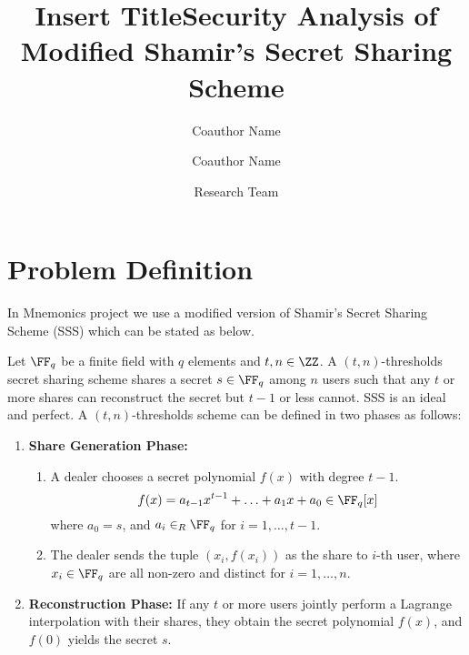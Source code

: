 \documentclass[envcountsame,runningheads,notitlepage]{llncs}
\title{Insert Title}
\date{}
\author{
	Coauthor Name\inst{1} \and
	Coauthor Name\inst{2}
}%
\institute{Coauthor University\\
	\href{mailto:mail@mail.com}{mail@mail.com} \and
	Coauthor University\\
	\href{mailto:mail@mail.com}{mail@mail.com}
}  %
\author{}
\institute{}
\begin{document}
	\title{Security Analysis of Modified Shamir's Secret Sharing Scheme}
	
	\author{Research Team}
	\maketitle
	
	\section{Problem Definition}
	In Mnemonics project we use a modified version of Shamir's Secret Sharing Scheme (SSS) \cite{Shamir79} which can be stated as below. 
	
	\begin{definition}\label{def:shamir}
		Let $\FF_q$ be a finite field with $q$ elements and $t,n \in \ZZ$. A $(t, n)$-thresholds secret sharing scheme shares a secret $s \in \FF_q$ among $n$ users such that any $t$ or more shares can reconstruct the secret but $t-1$ or less cannot. SSS is an ideal and perfect. A $(t, n)$-thresholds scheme can be defined in two phases as follows:
		
		\begin{enumerate}
			\item \textbf{Share Generation Phase:} 
			\begin{enumerate}
				\item A dealer chooses a secret polynomial $f (x)$ with degree $t - 1$.
				\begin{equation*}
				f (x) = a_{t-1}x^{t-1} + \ldots + a_1x + a_0 \in \FF_q [x]
				\end{equation*}
				where $a_0 = s$, and $a_i \in_{R} \FF_q$ for $i = 1, \ldots, t-1$. 
				\item The dealer sends the tuple $(x_{i}, f (x_{i}))$ as the share to $i$-th user, where $x_{i} \in \FF_q$ are all non-zero and distinct for $i = 1, \ldots, n$. 
			\end{enumerate}
			
			\item \textbf{Reconstruction Phase:} 
			If any $t$ or more users jointly perform a Lagrange interpolation with their shares, they obtain the secret polynomial $f (x)$, and $f(0)$ yields the secret $s$.
		\end{enumerate}
	\end{definition}
	
\end{document}
